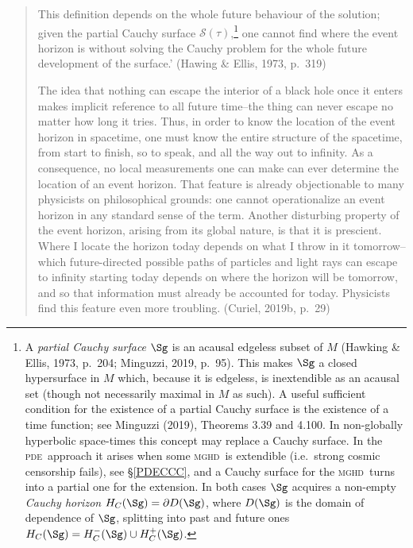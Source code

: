 \documentclass[12pt]{article}
\newcommand{\mghd}{\textsc{mghd}}
\newcommand{\pde}{\textsc{pde}}
\newcommand{\p}{\partial}
\begin{document}
 \begin{quote}
\begin{small}
This definition depends on the whole future behaviour of the solution; given the partial Cauchy surface $\mathcal{S}(\tau)$,\footnote{A \emph{partial Cauchy surface} $\Sg$ is an acausal edgeless subset of $M$ (Hawking \& Ellis, 1973, p.\ 204; Minguzzi, 2019, p.\ 95). This makes $\Sg$ a closed hypersurface in $M$ which, 
because it is edgeless, is inextendible as an acausal set (though not necessarily maximal in $M$ as such). A useful sufficient condition for the existence of a partial Cauchy surface is the existence of a time function; see Minguzzi (2019), Theorems 3.39 and 4.100.  In non-globally hyperbolic space-times this concept may  replace a Cauchy surface. In the \pde\ approach it arises when some \mghd\ is extendible (i.e.\ strong cosmic censorship fails), see \S\ref{PDECCC}, and a Cauchy surface 
for the \mghd\ turns into a partial one for the extension. 
In both cases $\Sg$ acquires a non-empty \emph{Cauchy horizon} $H_C(\Sg)=\p D(\Sg)$, where $D(\Sg)$ is the domain of dependence of $\Sg$, splitting into past and future ones $H_C(\Sg)=H_C^-(\Sg)\cup H_C^+(\Sg)$. 
 }
  one cannot find where the event horizon is without solving the Cauchy problem for the whole future development of the surface.' (Hawing \& Ellis, 1973, p.\ 319)

The idea that nothing can escape the interior of a black hole once it enters makes implicit reference to all future time--the thing can never escape no matter how long it tries. Thus, in order to know the location of the event horizon in spacetime, one must know the entire structure of the spacetime, from start to finish, so to speak, and all the way out to infinity. As a consequence, no local measurements one can make can ever determine the location of an event horizon. That feature is already objectionable to many physicists on philosophical grounds: one cannot operationalize an event horizon in any standard sense of the term. Another disturbing property of the event horizon, arising from its global nature, is that it is prescient. Where I locate the horizon today depends on what I throw in it tomorrow--which future-directed possible paths of particles and light rays can escape to infinity starting today depends on where the horizon will be tomorrow, and so that information must already be accounted for today. Physicists find this feature even more troubling. (Curiel, 2019b, p.\ 29)
\end{small}
\end{quote}
\end{document}
